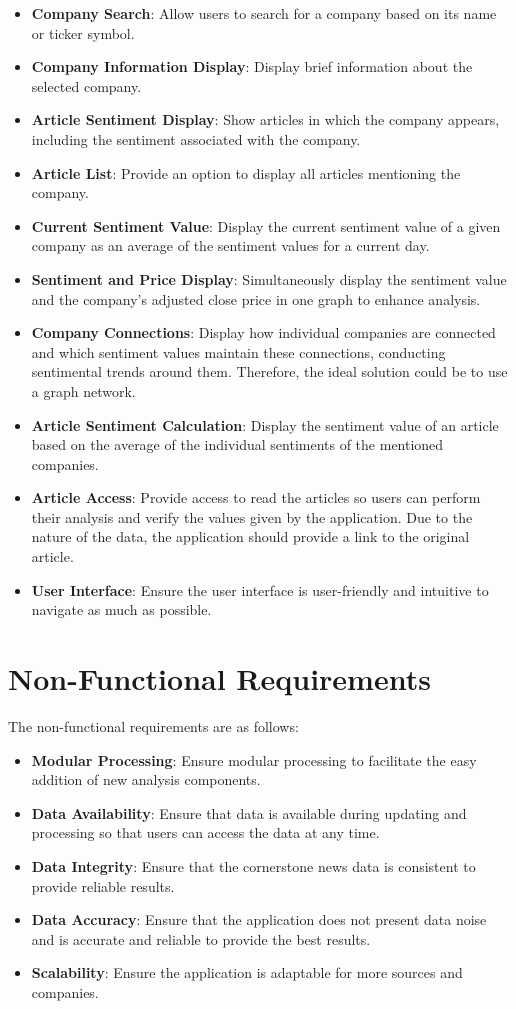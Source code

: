 \begin{itemize}
    \item \textbf{Company Search}: Allow users to search for a company based on its name or ticker symbol.
    \item \textbf{Company Information Display}: Display brief information about the selected company.
    \item \textbf{Article Sentiment Display}: Show articles in which the company appears, including the sentiment associated with the company.
    \item \textbf{Article List}: Provide an option to display all articles mentioning the company.
    \item \textbf{Current Sentiment Value}: Display the current sentiment value of a given company as an average of the sentiment values for a current day.
    \item \textbf{Sentiment and Price Display}: Simultaneously display the sentiment value and the company's adjusted close price in one graph to enhance analysis.
    \item \textbf{Company Connections}: Display how individual companies are connected and which sentiment values maintain these connections, conducting sentimental trends around them. Therefore, the ideal solution could be to use a graph network.
    \item \textbf{Article Sentiment Calculation}: Display the sentiment value of an article based on the average of the individual sentiments of the mentioned companies.
    \item \textbf{Article Access}: Provide access to read the articles so users can perform their analysis and verify the values given by the application. Due to the nature of the data, the application should provide a link to the original article.
    \item \textbf{User Interface}: Ensure the user interface is user-friendly and intuitive to navigate as much as possible.
\end{itemize}

\section{Non-Functional Requirements}
\label{sec:non-functional-requirements}
The non-functional requirements are as follows:

\begin{itemize}
    \item \textbf{Modular Processing}: Ensure modular processing to facilitate the easy addition of new analysis components.
    \item \textbf{Data Availability}: Ensure that data is available during updating and processing so that users can access the data at any time.
    \item \textbf{Data Integrity}: Ensure that the cornerstone news data is consistent to provide reliable results. 
    \item \textbf{Data Accuracy}: Ensure that the application does not present data noise and is accurate and reliable to provide the best results.
    \item \textbf{Scalability}: Ensure the application is adaptable for more sources and companies.
\end{itemize}
